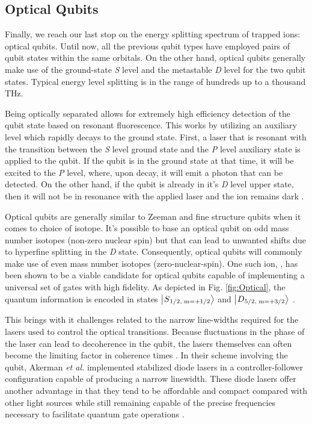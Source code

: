 \subsection{Optical Qubits}
Finally, we reach our last stop on the energy splitting spectrum of trapped ions: optical qubits. Until now, all the previous qubit types have employed pairs of qubit states within the same orbitals. On the other hand, optical qubits generally make use of the ground-state \textit{S} level and the metastable \textit{D} level for the two qubit states. Typical energy level splitting is in the range of hundreds up to a thousand THz. 

Being optically separated allows for extremely high efficiency detection of the qubit state based on resonant fluorescence. This works by utilizing an auxiliary level which rapidly decays to the ground state. First, a laser that is resonant with the transition between the \textit{S} level ground state and the \textit{P} level auxiliary state is applied to the qubit. If the qubit is in the ground state at that time, it will be excited to the \textit{P} level, where, upon decay, it will emit a photon that can be detected. On the other hand, if the qubit is already in it's \textit{D} level upper state, then it will not be in resonance with the applied laser and the ion remains dark \cite{Bruzewicz}. 

Optical qubits are generally similar to Zeeman and fine structure qubits when it comes to choice of isotope. It's possible to base an optical qubit on odd mass number isotopes (non-zero nuclear spin) but that can lead to unwanted shifts due to hyperfine splitting in the \textit{D} state. Consequently, optical qubits will commonly make use of even mass number isotopes (zero-nuclear-spin). One such ion, , has been shown to be a viable candidate for optical qubits capable of implementing a universal set of gates with high fidelity. As depicted in Fig. \ref{fig:Optical}, the quantum information is encoded in states $\ket{\textsuperscript{}{S}\textsubscript{1/2, m=+1/2}}$ and $\ket{\textsuperscript{}{D}\textsubscript{5/2, m=+3/2}}$ \cite{Akerman}. 

This brings with it challenges related to the narrow line-widths required for the lasers used to control the optical transitions. Because fluctuations in the phase of the laser can lead to decoherence in the qubit, the lasers themselves can often become the limiting factor in coherence times \cite{Bruzewicz}. In their scheme involving the  qubit, Akerman \textit{et al.} implemented stabilized diode lasers in a controller-follower configuration capable of producing a narrow linewidth. These diode lasers offer another advantage in that they tend to be affordable and compact compared with other light sources while still remaining capable of the precise frequencies necessary to facilitate quantum gate operations \cite{Akerman}.

